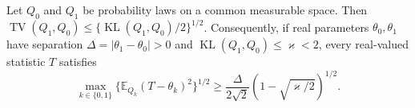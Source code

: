 Let \(Q_0\) and \(Q_1\) be probability laws on a common measurable space. Then \(\operatorname{TV}(Q_1,Q_0)\le\{\operatorname{KL}(Q_1,Q_0)/2\}^{1/2}\). Consequently, if real parameters \(\theta_0,\theta_1\) have separation \(\Delta=|\theta_1-\theta_0|>0\) and \(\operatorname{KL}(Q_1,Q_0)\le\varkappa<2\), every real-valued statistic \(T\) satisfies
\[
\max_{k\in\{0,1\}}\{\mathbb E_{Q_k}(T-\theta_k)^2\}^{1/2}
\ge\frac{\Delta}{2\sqrt2}\left(1-\sqrt{\varkappa/2}\right)^{1/2}.
\]